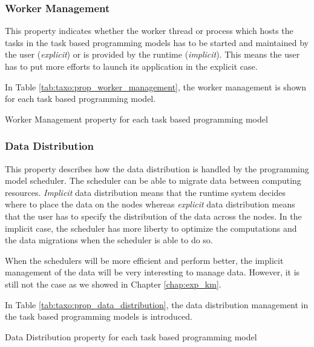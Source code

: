 \subsubsection{Worker Management}
This property indicates whether the worker thread or process which hosts the tasks in the task based programming models has to be started and maintained by the user (\textit{explicit}) or is provided by the runtime (\textit{implicit}).
This means the user has to put more efforts to launch its application in the explicit case.

In Table \ref{tab:taxo:prop_worker_management}, the worker management is shown for each task based programming model.
\begin{table}[H]
	\caption{Worker Management property for each task based programming model \label{tab:taxo:prop_worker_management}}
	\centering
	\begin{multicols}{2}
		

		
	\end{multicols}
\end{table}

\subsubsection{Data Distribution}
This property describes how the data distribution is handled by the programming model scheduler.
The scheduler can be able to migrate data between computing resources.
\textit{Implicit} data distribution means that the runtime system decides where to place the data on the nodes whereas \textit{explicit} data distribution means that the user has to specify the distribution of the data across the nodes.
In the implicit case, the scheduler has more liberty to optimize the computations and the data migrations when the scheduler is able to do so.

When the schedulers will be more efficient and perform better, the implicit management of the data will be very interesting to manage data.
However, it is still not the case as we showed in Chapter \ref{chap:exp_km}.

In Table \ref{tab:taxo:prop_data_distribution}, the data distribution management in the task based programming models is introduced.
\begin{table}[H]
	\caption{Data Distribution property for each task based programming model \label{tab:taxo:prop_data_distribution}}
	\centering
	\begin{multicols}{2}
		

		
	\end{multicols}
\end{table}


